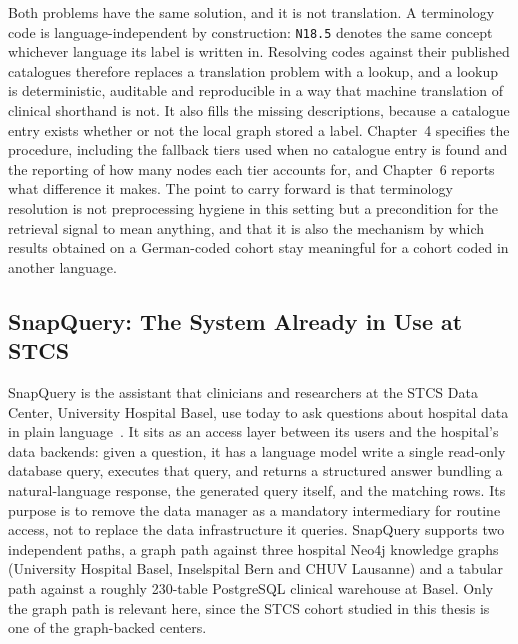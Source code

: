 Both problems have the same solution, and it is not translation. A terminology
code is language-independent by construction: \texttt{N18.5} denotes the same
concept whichever language its label is written in. Resolving codes against their
published catalogues therefore replaces a translation problem with a lookup, and
a lookup is deterministic, auditable and reproducible in a way that machine
translation of clinical shorthand is not. It also fills the missing descriptions,
because a catalogue entry exists whether or not the local graph stored a label.
Chapter~4 specifies the procedure, including the fallback tiers used when no
catalogue entry is found and the reporting of how many nodes each tier accounts
for, and Chapter~6 reports what difference it makes. The point to carry forward
is that terminology resolution is not preprocessing hygiene in this setting but a
precondition for the retrieval signal to mean anything, and that it is also the
mechanism by which results obtained on a German-coded cohort stay meaningful for
a cohort coded in another language.

\subsection{SnapQuery: The System Already in Use at STCS} \label{subsec:snapquery-background}

SnapQuery is the assistant that clinicians and researchers at the STCS Data
Center, University Hospital Basel, use today to ask questions about hospital data
in plain language~\cite{snapquery2026}. It sits as an access layer between its
users and the hospital's data backends: given a question, it has a language model
write a single read-only database query, executes that query, and returns a
structured answer bundling a natural-language response, the generated query
itself, and the matching rows. Its purpose is to remove the data manager as a
mandatory intermediary for routine access, not to replace the data infrastructure
it queries. SnapQuery supports two independent paths, a graph path against three
hospital Neo4j knowledge graphs (University Hospital Basel, Inselspital Bern and
CHUV Lausanne) and a tabular path against a roughly 230-table PostgreSQL clinical
warehouse at Basel. Only the graph path is relevant here, since the STCS cohort
studied in this thesis is one of the graph-backed centers.

